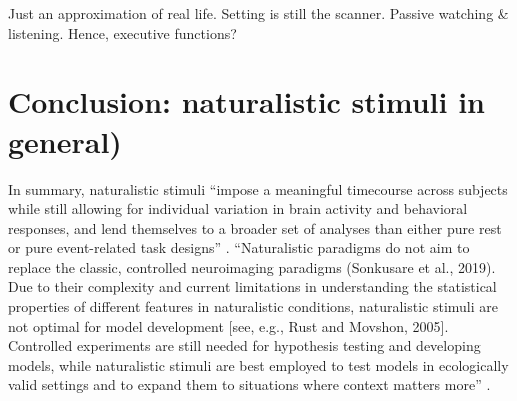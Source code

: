 %
Just an approximation of real life.
%
Setting is still the scanner.
%
Passive watching \& listening. Hence, executive functions?


\section{Conclusion: naturalistic stimuli in general)}
%
In summary, naturalistic stimuli ``impose a meaningful timecourse across
subjects while still allowing for individual variation in brain activity and
behavioral responses, and lend themselves to a broader set of analyses than
either pure rest or pure event-related task designs'' \citep{finn2017can}.
%
``Naturalistic paradigms do not aim to replace the classic, controlled
neuroimaging paradigms (Sonkusare et al., 2019). Due to their complexity and
current limitations in understanding the statistical properties of different
features in naturalistic conditions, naturalistic stimuli are not optimal for
model development [see, e.g., Rust and Movshon, 2005]. Controlled experiments
are still needed for hypothesis testing and developing models, while
naturalistic stimuli are best employed to test models in ecologically valid
settings and to expand them to situations where context matters
more'' \citep{saarimaki2021naturalistic}.
